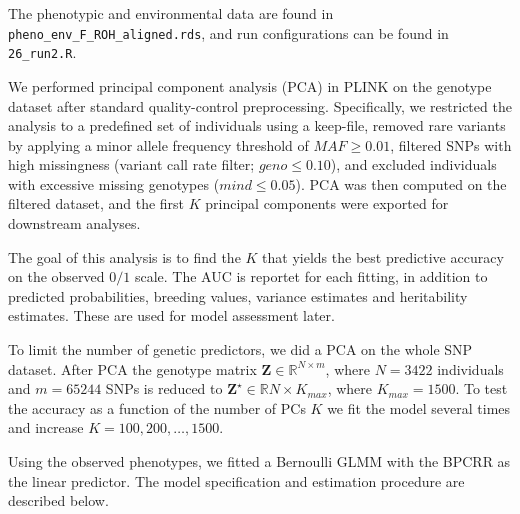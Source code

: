 The phenotypic and environmental data are found in \texttt{pheno\_env\_F\_ROH\_aligned.rds}, and run configurations can be found in \texttt{26\_run2.R}.

We performed principal component analysis (PCA) in PLINK on the genotype dataset after standard quality-control preprocessing. Specifically, we restricted the analysis to a predefined set of individuals using a keep-file, removed rare variants by applying a minor allele frequency threshold of $MAF \geq 0.01$, filtered SNPs with high missingness (variant call rate filter; $geno \leq 0.10$), and excluded individuals with excessive missing genotypes ($mind \leq 0.05$). PCA was then computed on the filtered dataset, and the first $K$ principal components were exported for downstream analyses.



The goal of this analysis is to find the $K$ that yields the best predictive accuracy on the observed $0/1$ scale. The AUC is reportet for each fitting, in addition to predicted probabilities, breeding values, variance estimates and heritability estimates. These are used for model assessment later.  



To limit the number of genetic predictors, we did a PCA on the whole SNP dataset. After PCA the genotype matrix $\mathbf{Z} \in \mathbb{R}^{N \times m}$, where $N = 3422$ individuals and $m = 65 244$ SNPs is reduced to $\mathbf{Z}^\star \in \mathbb{R}{N \times K_{max}}$, where $K_{max} = 1500$. To test the accuracy as a function of the number of PCs $K$ we fit the model several times and increase $K = 100, 200, \dots, 1500$.



Using the observed phenotypes, we fitted a Bernoulli GLMM with the BPCRR as the linear predictor. The model specification and estimation procedure are described below.

